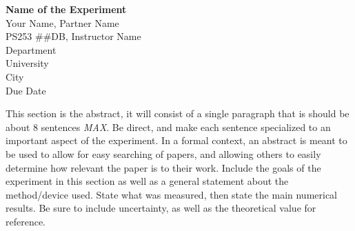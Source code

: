 \documentclass[11pt, letterpaper, notitlepage]{article}
\renewenvironment{abstract}
 {\small
  \begin{center}
  \bfseries \abstractname\vspace{-.5em}\vspace{0pt}
  \end{center}
  \list{}{%
    \setlength{\leftmargin}{1in}%
    \setlength{\rightmargin}{\leftmargin}%
  }%
  \item\relax}
 {\endlist}
\begin{document}
 
\begin{center}
    \textbf{\Large Name of the Experiment}\\
    \vspace{0.5cm}
    Your Name, Partner Name\\
    \vspace{0.25cm}
    PS253 \#\#DB, Instructor Name\\
    \vspace{0.25cm}
    Department\\
    University\\
    City\\
    \vspace{0.25cm}
    Due Date
\end{center}

\begin{abstract}
    This section is the abstract, it will consist of a single paragraph that is should
    be about 8 sentences \emph{MAX}. Be direct, and make each sentence specialized to 
    an important aspect of the experiment. In a formal context, an abstract is meant 
    to be used to allow for easy searching of papers, and allowing others to easily 
    determine how relevant the paper is to their work. Include the goals of the 
    experiment in this section as well as a general statement about the method/device 
    used. State what was measured, then state the main numerical results. Be sure to 
    include uncertainty, as well as the theoretical value for reference.
\end{abstract}
\end{document}
